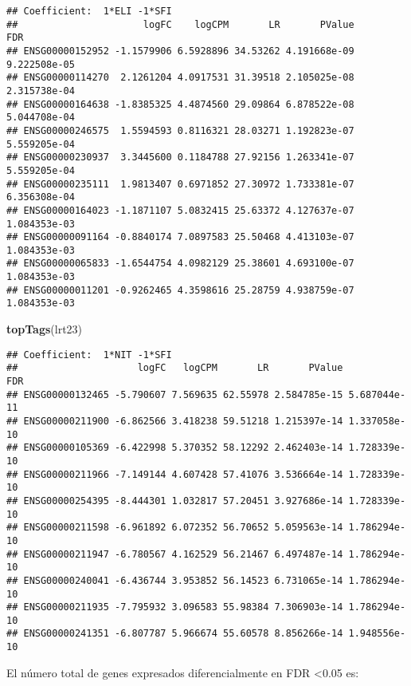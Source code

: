 \documentclass[
]{article}
\newenvironment{Shaded}{\begin{snugshade}}{\end{snugshade}}
\newcommand{\KeywordTok}[1]{\textcolor[rgb]{0.13,0.29,0.53}{\textbf{#1}}}
\newcommand{\NormalTok}[1]{#1}
\begin{document}
\begin{verbatim}
## Coefficient:  1*ELI -1*SFI 
##                      logFC    logCPM       LR       PValue          FDR
## ENSG00000152952 -1.1579906 6.5928896 34.53262 4.191668e-09 9.222508e-05
## ENSG00000114270  2.1261204 4.0917531 31.39518 2.105025e-08 2.315738e-04
## ENSG00000164638 -1.8385325 4.4874560 29.09864 6.878522e-08 5.044708e-04
## ENSG00000246575  1.5594593 0.8116321 28.03271 1.192823e-07 5.559205e-04
## ENSG00000230937  3.3445600 0.1184788 27.92156 1.263341e-07 5.559205e-04
## ENSG00000235111  1.9813407 0.6971852 27.30972 1.733381e-07 6.356308e-04
## ENSG00000164023 -1.1871107 5.0832415 25.63372 4.127637e-07 1.084353e-03
## ENSG00000091164 -0.8840174 7.0897583 25.50468 4.413103e-07 1.084353e-03
## ENSG00000065833 -1.6544754 4.0982129 25.38601 4.693100e-07 1.084353e-03
## ENSG00000011201 -0.9262465 4.3598616 25.28759 4.938759e-07 1.084353e-03
\end{verbatim}

\begin{Shaded}
\begin{Highlighting}[]
\KeywordTok{topTags}\NormalTok{(lrt23)}
\end{Highlighting}
\end{Shaded}

\begin{verbatim}
## Coefficient:  1*NIT -1*SFI 
##                     logFC   logCPM       LR       PValue          FDR
## ENSG00000132465 -5.790607 7.569635 62.55978 2.584785e-15 5.687044e-11
## ENSG00000211900 -6.862566 3.418238 59.51218 1.215397e-14 1.337058e-10
## ENSG00000105369 -6.422998 5.370352 58.12292 2.462403e-14 1.728339e-10
## ENSG00000211966 -7.149144 4.607428 57.41076 3.536664e-14 1.728339e-10
## ENSG00000254395 -8.444301 1.032817 57.20451 3.927686e-14 1.728339e-10
## ENSG00000211598 -6.961892 6.072352 56.70652 5.059563e-14 1.786294e-10
## ENSG00000211947 -6.780567 4.162529 56.21467 6.497487e-14 1.786294e-10
## ENSG00000240041 -6.436744 3.953852 56.14523 6.731065e-14 1.786294e-10
## ENSG00000211935 -7.795932 3.096583 55.98384 7.306903e-14 1.786294e-10
## ENSG00000241351 -6.807787 5.966674 55.60578 8.856266e-14 1.948556e-10
\end{verbatim}

El número total de genes expresados diferencialmente en FDR
\textless0.05 es:
\end{document}
